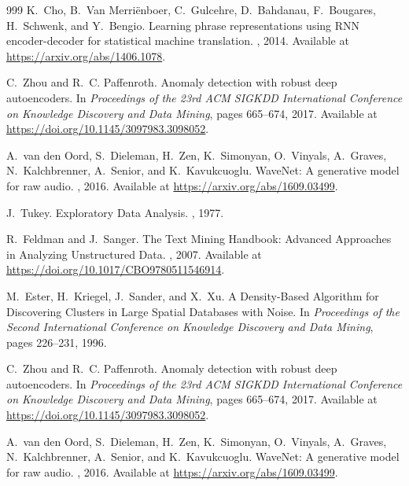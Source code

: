 \documentclass[12pt, a4paper,twoside]{report}
\theoremstyle{plain} %
\theoremstyle{definition} %
\theoremstyle{remark} %
\numberwithin{equation}{chapter}
\begin{document}
\begin{thebibliography}{999}
K.~Cho, B.~Van Merriënboer, C.~Gulcehre, D.~Bahdanau, F.~Bougares, H.~Schwenk, and Y.~Bengio.
\newblock Learning phrase representations using RNN encoder-decoder for statistical machine translation.
, 2014.
\newblock Available at \url{https://arxiv.org/abs/1406.1078}.

C.~Zhou and R.~C. Paffenroth.
\newblock Anomaly detection with robust deep autoencoders.
\newblock In {\em Proceedings of the 23rd ACM SIGKDD International Conference on Knowledge Discovery and Data Mining}, pages 665--674, 2017.
\newblock Available at \url{https://doi.org/10.1145/3097983.3098052}.

A.~van den Oord, S.~Dieleman, H.~Zen, K.~Simonyan, O.~Vinyals, A.~Graves, N.~Kalchbrenner, A.~Senior, and K.~Kavukcuoglu.
\newblock WaveNet: A generative model for raw audio.
, 2016.
\newblock Available at \url{https://arxiv.org/abs/1609.03499}.


J.~Tukey.
\newblock Exploratory Data Analysis.
, 1977.

R.~Feldman and J.~Sanger.
\newblock The Text Mining Handbook: Advanced Approaches in Analyzing Unstructured Data.
, 2007.
\newblock Available at \url{https://doi.org/10.1017/CBO9780511546914}.

M.~Ester, H.~Kriegel, J.~Sander, and X.~Xu.
\newblock A Density-Based Algorithm for Discovering Clusters in Large Spatial Databases with Noise.
\newblock In {\em Proceedings of the Second International Conference on Knowledge Discovery and Data Mining}, pages 226--231, 1996.



C.~Zhou and R.~C. Paffenroth.
\newblock Anomaly detection with robust deep autoencoders.
\newblock In {\em Proceedings of the 23rd ACM SIGKDD International Conference on Knowledge Discovery and Data Mining}, pages 665--674, 2017.
\newblock Available at \url{https://doi.org/10.1145/3097983.3098052}.

A.~van den Oord, S.~Dieleman, H.~Zen, K.~Simonyan, O.~Vinyals, A.~Graves, N.~Kalchbrenner, A.~Senior, and K.~Kavukcuoglu.
\newblock WaveNet: A generative model for raw audio.
, 2016.
\newblock Available at \url{https://arxiv.org/abs/1609.03499}.


\end{thebibliography}
\end{document}
